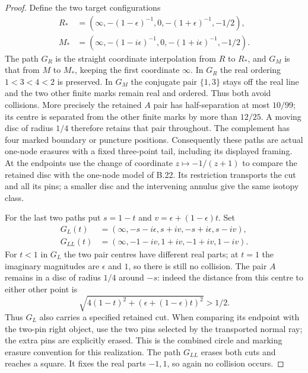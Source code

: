 \begin{proof}
Define the two target configurations
\[
\begin{aligned}
 R_*&=(\infty,-(1-\epsilon)^{-1},0,
                 -(1+\epsilon)^{-1},-1/2),\\
 M_*&=(\infty,-(1-i\epsilon)^{-1},0,
                 -(1+i\epsilon)^{-1},-1/2).
\end{aligned}                                                     \tag{B.57}
\]
The path $G_R$ is the straight coordinate interpolation
from $R$ to $R_*$, and $G_M$ is that from $M$ to $M_*$,
keeping the first coordinate $\infty$.  In $G_R$ the real
ordering $1<3<4<2$ is preserved.  In $G_M$ the conjugate
pair $\{1,3\}$ stays off the real line and the two other
finite marks remain real and ordered.  Thus both avoid
collisions.  More precisely the retained $A$ pair has
half-separation at most $10/99$; its centre is separated
from the other finite marks by more than $12/25$.  A moving
disc of radius $1/4$ therefore retains that pair throughout.
The complement has four marked boundary or puncture positions.
Consequently these paths are actual one-node erasures with
a fixed three-point tail, including its displayed framing.
At the endpoints use the change of coordinate $z\mapsto
-1/(z+1)$ to compare the retained disc with the one-node
model of B.22.  Its restriction transports the cut and all
its pins; a smaller disc and the intervening annulus give
the same isotopy class.

For the last two paths put $s=1-t$ and
$v=\epsilon+(1-\epsilon)t$.  Set
\[
\begin{aligned}
 G_L(t)&=(\infty,-s-i\epsilon,s+iv,-s+i\epsilon,s-iv),\\
 G_{LL}(t)&=(\infty,-1-iv,1+iv,-1+iv,1-iv).
\end{aligned}                                                     \tag{B.58}
\]
For $t<1$ in $G_L$ the two pair centres have different
real parts; at $t=1$ the imaginary magnitudes are
$\epsilon$ and $1$, so there is still no collision.
The pair $A$ remains in a disc of radius $1/4$ around
$-s$: indeed the distance from this centre to either
other point is
\[
 \sqrt{4(1-t)^2+(\epsilon+(1-\epsilon)t)^2}>1/2.
\]
Thus $G_L$ also carries a specified retained cut.  When
comparing its endpoint with the two-pin right object, use
the two pins selected by the transported normal ray;
the extra pins are explicitly erased.  This is the combined
circle and marking erasure convention for this realization.
The path $G_{LL}$ erases both cuts and reaches a square.
It fixes the real parts $-1,1$, so again no collision occurs.


\end{proof}
